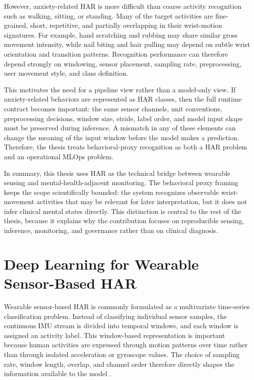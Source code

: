 However, anxiety-related HAR is more difficult than coarse activity recognition such as walking, sitting, or standing. Many of the target activities are fine-grained, short, repetitive, and partially overlapping in their wrist-motion signatures. For example, hand scratching and rubbing may share similar gross movement intensity, while nail biting and hair pulling may depend on subtle wrist orientation and transition patterns. Recognition performance can therefore depend strongly on windowing, sensor placement, sampling rate, preprocessing, user movement style, and class definition.

This motivates the need for a pipeline view rather than a model-only view. If anxiety-related behaviors are represented as HAR classes, then the full runtime contract becomes important: the same sensor channels, unit conventions, preprocessing decisions, window size, stride, label order, and model input shape must be preserved during inference. A mismatch in any of these elements can change the meaning of the input window before the model makes a prediction. Therefore, the thesis treats behavioral-proxy recognition as both a HAR problem and an operational MLOps problem.

In summary, this thesis uses HAR as the technical bridge between wearable sensing and mental-health-adjacent monitoring. The behavioral proxy framing keeps the scope scientifically bounded: the system recognizes observable wrist-movement activities that may be relevant for later interpretation, but it does not infer clinical mental states directly. This distinction is central to the rest of the thesis, because it explains why the contribution focuses on reproducible sensing, inference, monitoring, and governance rather than on clinical diagnosis.

\section{Deep Learning for Wearable Sensor-Based HAR}

Wearable sensor-based HAR is commonly formulated as a multivariate time-series classification problem. Instead of classifying individual sensor samples, the continuous IMU stream is divided into temporal windows, and each window is assigned an activity label. This window-based representation is important because human activities are expressed through motion patterns over time rather than through isolated acceleration or gyroscope values. The choice of sampling rate, window length, overlap, and channel order therefore directly shapes the information available to the model \cite{lara2013survey,bulling2014tutorial,bao2004activity}.

